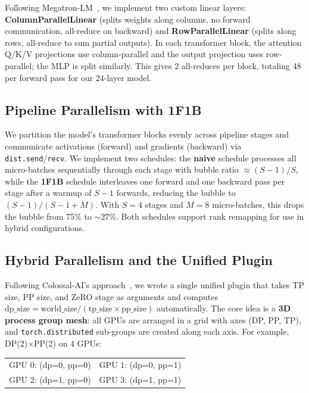 \documentclass[conference]{IEEEtran}
\begin{document}
Following Megatron-LM~\cite{DBLP:journals/corr/abs-1909-08053}, we implement two custom linear layers: \textbf{ColumnParallelLinear} (splits weights along columns, no forward communication, all-reduce on backward) and \textbf{RowParallelLinear} (splits along rows, all-reduce to sum partial outputs). In each transformer block, the attention Q/K/V projections use column-parallel and the output projection uses row-parallel; the MLP is split similarly. This gives 2 all-reduces per block, totaling 48 per forward pass for our 24-layer model.

\subsection{Pipeline Parallelism with 1F1B}

We partition the model's transformer blocks evenly across pipeline stages and communicate activations (forward) and gradients (backward) via \texttt{dist.send}/\texttt{recv}. We implement two schedules: the \textbf{naive} schedule processes all micro-batches sequentially through each stage with bubble ratio $\approx (S{-}1)/S$, while the \textbf{1F1B} schedule interleaves one forward and one backward pass per stage after a warmup of $S{-}1$ forwards, reducing the bubble to $(S{-}1)/(S{-}1+M)$. With $S=4$ stages and $M=8$ micro-batches, this drops the bubble from 75\% to $\sim$27\%. Both schedules support rank remapping for use in hybrid configurations.

\subsection{Hybrid Parallelism and the Unified Plugin}

Following Colossal-AI's approach~\cite{10.1145/3605573.3605613}, we wrote a single unified plugin that takes TP size, PP size, and ZeRO stage as arguments and computes $\text{dp\_size} = \text{world\_size} / (\text{tp\_size} \times \text{pp\_size})$ automatically. The core idea is a \textbf{3D process group mesh}: all GPUs are arranged in a grid with axes (DP, PP, TP), and \texttt{torch.distributed} sub-groups are created along each axis. For example, DP(2)$\times$PP(2) on 4 GPUs:

\begin{center}
\small
\begin{tabular}{ll}
GPU 0: (dp=0, pp=0) & GPU 1: (dp=0, pp=1) \\
GPU 2: (dp=1, pp=0) & GPU 3: (dp=1, pp=1) \\
\end{tabular}
\end{center}
\end{document}
